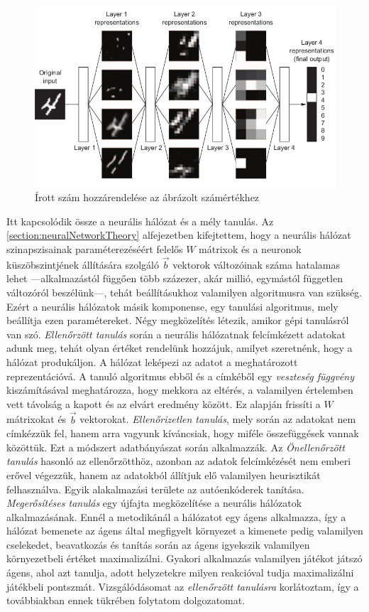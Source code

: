 \begin{figure}[h]
	\centering
	\includegraphics[width=0.8\columnwidth]{fig/digit_classification.png}
	\caption{Írott szám hozzárendelése az ábrázolt számértékhez}
	\label{fig:digit_classification}
	\footnotemark
\end{figure}

Itt kapcsolódik össze a neurális hálózat és a mély tanulás. Az \ref{section:neuralNetworkTheory} alfejezetben kifejtettem, hogy a neurális hálózat szinapszisainak paraméterezéséért felelős $W$ mátrixok és a neuronok küszöbszintjének állítására szolgáló $\vec{b}$ vektorok változóinak száma hatalamas lehet ---alkalmazástól függően több százezer, akár millió, egymástól független változóról beszélünk---, tehát beállításukhoz valamilyen algoritmusra van szükség.
Ezért a neurális hálózatok másik komponense, egy tanulási algoritmus, mely beállítja ezen paramétereket. Négy  megközelítés létezik, amikor gépi tanulásról van szó.
\emph{Ellenőrzött tanulás} során a neurális hálózatnak felcímkézett adatokat adunk meg, tehát olyan értéket rendelünk hozzájuk, amilyet szeretnénk, hogy a hálózat produkáljon. A hálózat leképezi az adatot a meghatározott reprezentációvá. A tanuló algoritmus ebből és a címkéből egy \emph{veszteség függvény} kiszámításával meghatározza, hogy mekkora az eltérés, a valamilyen értelemben vett távolság a kapott és az elvárt eredmény között. Ez alapján frissíti a $W$ mátrixokat és $\vec{b}$ vektorokat.
\emph{Ellenőrizetlen tanulás}, mely során az adatokat nem címkézzük fel, hanem arra vagyunk kíváncsiak, hogy miféle összefüggések vannak közöttük. Ezt a módszert adatbányászat során alkalmazzák. 
Az \emph{Önellenőrzött tanulás} hasonló az ellenőrzötthöz, azonban az adatok felcímkézését nem emberi erővel végezzük, hanem az adatokból állítjuk elő valamilyen heurisztikát felhasználva. Egyik alakalmazási területe az autóenkóderek tanítása.
\emph{Megerősítéses tanulás} egy újfajta megközelítése a neurális hálózatok alkalmazásának. Ennél a metodikánál a hálózatot egy ágens alkalmazza, így a hálózat bemenete az ágens által megfigyelt környezet a kimenete pedig valamilyen cselekedet, beavatkozás és tanítás során az ágens igyekszik valamilyen környezetbeli értéket maximalizálni. Gyakori alkalmazás valamilyen játékot játszó ágens, ahol azt tanulja, adott helyzetekre milyen reakcióval tudja maximalizálni játékbeli pontszmát.
Vizsgálódásomat az \emph{ellenőrzött tanulásra} korlátoztam, így a továbbiakban ennek tükrében folytatom dolgozatomat.

